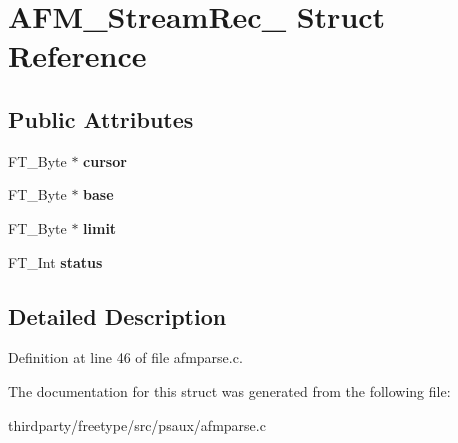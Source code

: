 \hypertarget{struct_a_f_m___stream_rec__}{}\section{A\+F\+M\+\_\+\+Stream\+Rec\+\_\+ Struct Reference}
\label{struct_a_f_m___stream_rec__}
\subsection*{Public Attributes}
\begin{DoxyCompactItemize}
\item 
\mbox{\label{struct_a_f_m___stream_rec___ab5a467e4625c197b1dbf2c42c54e30c8}} 
F\+T\+\_\+\+Byte $\ast$ {\bfseries cursor}
\item 
\mbox{\label{struct_a_f_m___stream_rec___aca982fdca458c65034e114890a809df0}} 
F\+T\+\_\+\+Byte $\ast$ {\bfseries base}
\item 
\mbox{\label{struct_a_f_m___stream_rec___a0db9e3a634b14255a0e2c349e5d0c9aa}} 
F\+T\+\_\+\+Byte $\ast$ {\bfseries limit}
\item 
\mbox{\label{struct_a_f_m___stream_rec___a65593439b53fcac040c64400955d61e7}} 
F\+T\+\_\+\+Int {\bfseries status}
\end{DoxyCompactItemize}


\subsection{Detailed Description}


Definition at line 46 of file afmparse.\+c.



The documentation for this struct was generated from the following file\+:\begin{DoxyCompactItemize}
\item 
thirdparty/freetype/src/psaux/afmparse.\+c\end{DoxyCompactItemize}
